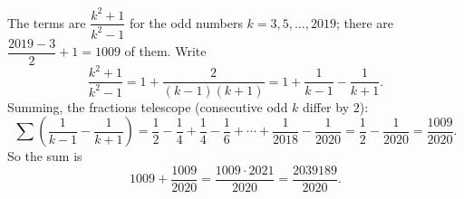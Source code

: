 The terms are $\dfrac{k^2+1}{k^2-1}$ for the odd numbers $k=3,5,\dots,2019$; there are $\dfrac{2019-3}{2}+1=1009$ of them. Write
\[
\dfrac{k^2+1}{k^2-1}=1+\dfrac{2}{(k-1)(k+1)}=1+\dfrac{1}{k-1}-\dfrac{1}{k+1}.
\]
Summing, the fractions telescope (consecutive odd $k$ differ by $2$):
\[
\sum\left(\dfrac{1}{k-1}-\dfrac{1}{k+1}\right)=\dfrac{1}{2}-\dfrac{1}{4}+\dfrac{1}{4}-\dfrac{1}{6}+\cdots+\dfrac{1}{2018}-\dfrac{1}{2020}=\dfrac{1}{2}-\dfrac{1}{2020}=\dfrac{1009}{2020}.
\]
So the sum is
\[
1009+\dfrac{1009}{2020}=\dfrac{1009\cdot2021}{2020}=\boxed{\dfrac{2039189}{2020}} .
\]
